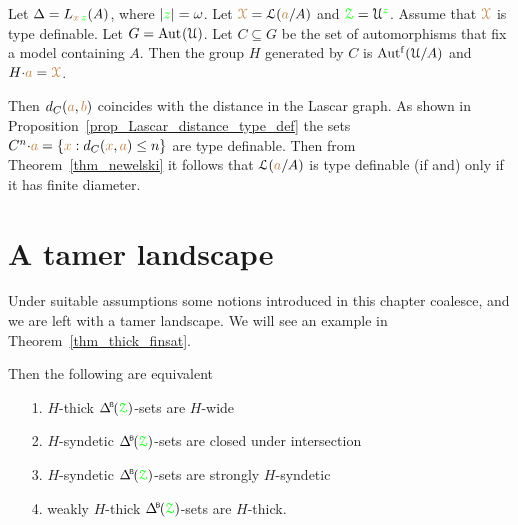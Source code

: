 
\begin{example}\label{ex_newelski}
  Let $\Delta=L_{{\color{brown} x}\,{\color{green} z}}(A)$, where $|{\color{green} z}|=\omega$.
  Let ${\color{brown}\EuScript X}=\EuScript L({\color{brown} a}/A)$ and ${\color{green}\EuScript Z}=\EuScript U^{\color{green} z}$.
  Assume that ${\color{brown}\EuScript X}$ is type definable.
  Let $G={\rm Aut\kern.15ex}(\EuScript U)$.
  Let $C\subseteq G$ be the set of automorphisms that fix a model containing $A$.
  Then the group $H$ generated by $C$ is $\mbox{Aut$^{\rm f}$}(\EuScript U/A)$ and $H{\cdot}{\color{brown} a}={\color{brown}\EuScript X}$.
  
  Then $d_C({\color{brown} a},{\color{brown} b})$ coincides with the distance in the Lascar graph.
  As shown in Proposition~\ref{prop_Lascar_distance_type_def} the sets $C^n{\cdot}{\color{brown} a}=\{{\color{brown} x}:d_C({\color{brown} x},{\color{brown} a})\le n\}$ are type definable.
  Then from Theorem~\ref{thm_newelski} it follows that $\EuScript L({\color{brown} a}/A)$ is type definable (if and) only if it has finite diameter.
\end{example} 

\section{A tamer landscape}\label{tame_landscape}

Under suitable assumptions some notions introduced in this chapter coalesce, and we are left with a tamer landscape.
We will see an example in Theorem~\ref{thm_thick_finsat}.

\begin{theorem}\label{thm_coalesce}
  Then the following are equivalent
  \begin{itemize}
    \item[1.] $H$-thick $\BDelta({\grZ})$-sets are $H$-wide
    \item[2.] $H$-syndetic $\BDelta({\grZ})$-sets are closed under intersection 
    \item[3.] $H$-syndetic $\BDelta({\grZ})$-sets are strongly $H$-syndetic
    \item[4.] weakly $H$-thick $\BDelta({\grZ})$-sets are $H$-thick.
  \end{itemize}
\end{theorem}

